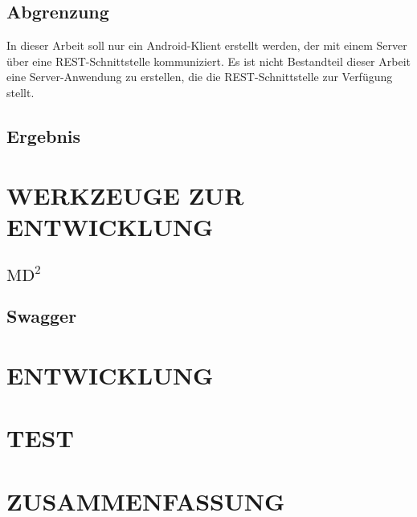 \documentclass[a4paper,twoside]{article}
\begin{document}
\subsection{Abgrenzung}
In dieser Arbeit soll nur ein Android-Klient erstellt werden, der mit einem Server \"uber eine REST-Schnittstelle kommuniziert. Es ist nicht Bestandteil dieser Arbeit eine Server-Anwendung zu erstellen, die die REST-Schnittstelle zur Verf\"ugung stellt.\\

\subsection{Ergebnis}

\section{\uppercase{Werkzeuge zur Entwicklung}}

\subsection{$\text{MD}^2$}

\subsection{Swagger}

\section{\uppercase{Entwicklung}}

\section{\uppercase{Test}}

\section{\uppercase{Zusammenfassung}}

\vfill
\end{document}
